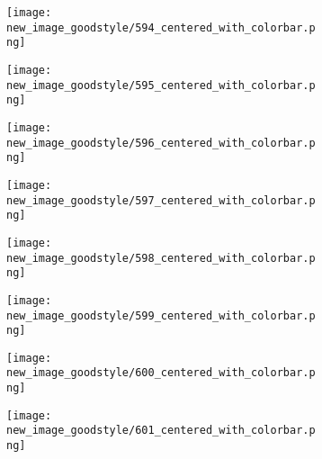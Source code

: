 \documentclass[a4paper,12pt]{article}
\begin{document}
\begin{figure}[H]
  \begin{subfigure}{0.11\textwidth}
    \texttt{[image: new\_image\_goodstyle/594\_centered\_with\_colorbar.png]}
  \end{subfigure}
  \hfill
  \begin{subfigure}{0.11\textwidth}
    \texttt{[image: new\_image\_goodstyle/595\_centered\_with\_colorbar.png]}
  \end{subfigure}
  \hfill
  \begin{subfigure}{0.11\textwidth}
    \texttt{[image: new\_image\_goodstyle/596\_centered\_with\_colorbar.png]}
  \end{subfigure}
  \hfill
  \begin{subfigure}{0.11\textwidth}
    \texttt{[image: new\_image\_goodstyle/597\_centered\_with\_colorbar.png]}
  \end{subfigure}
  \hfill
  \begin{subfigure}{0.11\textwidth}
    \texttt{[image: new\_image\_goodstyle/598\_centered\_with\_colorbar.png]}
  \end{subfigure}
  \hfill
  \begin{subfigure}{0.11\textwidth}
    \texttt{[image: new\_image\_goodstyle/599\_centered\_with\_colorbar.png]}
  \end{subfigure}
  \hfill
  \begin{subfigure}{0.11\textwidth}
    \texttt{[image: new\_image\_goodstyle/600\_centered\_with\_colorbar.png]}
  \end{subfigure}
  \hfill
  \begin{subfigure}{0.11\textwidth}
    \texttt{[image: new\_image\_goodstyle/601\_centered\_with\_colorbar.png]}
  \end{subfigure}
  \hfill
\end{figure}
\end{document}
